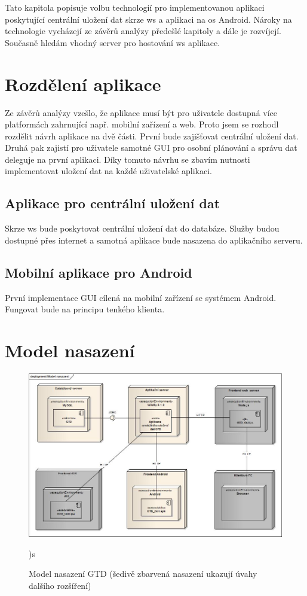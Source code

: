 \documentclass[thesis=B,czech]{FITthesis}[2012/06/26]
\begin{document}
Tato kapitola popisuje volbu technologií pro implementovanou aplikaci poskytující centrální uložení dat skrze \acrshort{ws} a aplikaci na \acrshort{os} Android. Nároky na technologie vycházejí ze závěrů analýzy předešlé kapitoly a dále je rozvíjejí.
Současně hledám vhodný server pro hostování \acrshort{ws} aplikace.

\section{Rozdělení aplikace}

Ze závěrů analýzy vzešlo, že aplikace musí být pro uživatele dostupná více platformách zahrnující např. mobilní zařízení a web. Proto jsem se rozhodl rozdělit návrh aplikace na dvě části. První bude zajišťovat centrální uložení dat. Druhá pak zajistí pro uživatele samotné GUI pro osobní plánování a správu dat deleguje na první aplikaci. Díky tomuto návrhu se zbavím nutnosti implementovat uložení dat na každé uživatelské aplikaci.

\subsection{Aplikace pro centrální uložení dat}

Skrze \acrshort{ws} bude poskytovat centrální uložení dat do databáze. Služby budou dostupné přes internet a samotná aplikace bude nasazena do aplikačního serveru.

\subsection{Mobilní aplikace pro Android}

První implementace GUI cílená na mobilní zařízení se systémem Android. Fungovat bude na  principu tenkého klienta\cite{gtd_thin_client}.

\section{Model nasazení}

\begin{figure}[h!]\centering
	\includegraphics[width=1\textwidth]{pictures/gtd_deployment_model}
	\caption{Model nasazení GTD (šedivě zbarvená nasazení ukazují úvahy dalšího rozšíření)})\label{fig:gtd_deployment_model}s
\end{figure}
\end{document}

